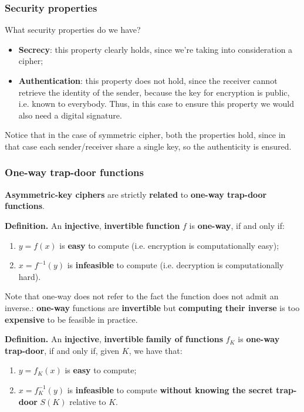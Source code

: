 \subsubsection{Security properties}
What security properties do we have?

\begin{itemize}
    \item \textbf{Secrecy}: this property clearly holds, since we're taking into consideration a cipher;
    \item \textbf{Authentication}: this property does not hold, since the receiver cannot retrieve the identity of the sender, because the key for encryption is public, i.e. known to everybody. Thus, in this case to ensure this property we would also need a digital signature.
\end{itemize}

Notice that in the case of symmetric cipher, both the properties hold, since in that case each sender/receiver share a single key, so the authenticity is ensured.

\subsubsection{One-way trap-door functions}
\textbf{Asymmetric-key ciphers} are strictly \textbf{related} to \textbf{one-way trap-door functions}.

\textbf{Definition.} An \textbf{injective}, \textbf{invertible} \textbf{function} $f$ is \textbf{one-way}, if and only if:

\begin{enumerate}
    \item $y = f(x)$ is \textbf{easy} to compute (i.e. encryption is computationally easy);
    \item $x = f^{-1}(y)$ is \textbf{infeasible} to compute (i.e. decryption is computationally hard).
\end{enumerate}

Note that one-way does not refer to the fact the function does not admit an inverse.: \textbf{one-way} functions are \textbf{invertible} but \textbf{computing their inverse} is too \textbf{expensive} to be feasible in practice.

\textbf{Definition.} An \textbf{injective}, \textbf{invertible} \textbf{family of functions} $f_K$ is \textbf{one-way trap-door}, if and only if, given $K$, we have that:

\begin{enumerate}
    \item $y = f_K(x)$ is \textbf{easy} to compute;
    \item $x = f^{-1}_K(y)$ is \textbf{infeasible} to compute \textbf{without knowing the secret trap-door} $S(K)$ relative to $K$.
\end{enumerate}


